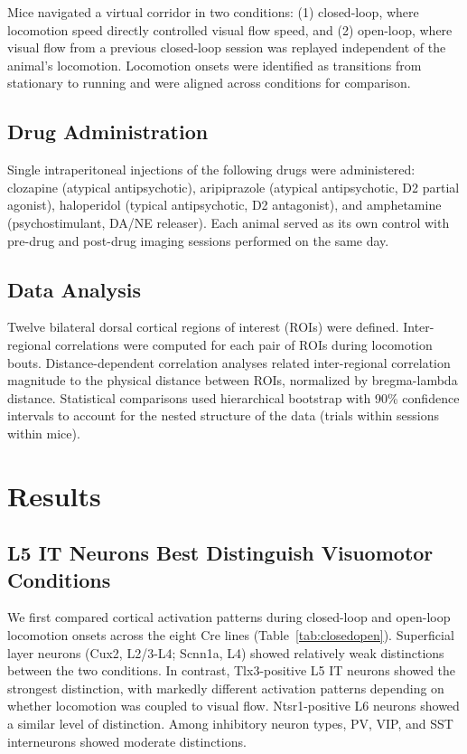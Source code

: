 \documentclass[11pt]{article}
\begin{document}
Mice navigated a virtual corridor in two conditions: (1) closed-loop, where locomotion speed directly controlled visual flow speed, and (2) open-loop, where visual flow from a previous closed-loop session was replayed independent of the animal's locomotion. Locomotion onsets were identified as transitions from stationary to running and were aligned across conditions for comparison.

\subsection{Drug Administration}

Single intraperitoneal injections of the following drugs were administered: clozapine (atypical antipsychotic), aripiprazole (atypical antipsychotic, D2 partial agonist), haloperidol (typical antipsychotic, D2 antagonist), and amphetamine (psychostimulant, DA/NE releaser). Each animal served as its own control with pre-drug and post-drug imaging sessions performed on the same day.

\subsection{Data Analysis}

Twelve bilateral dorsal cortical regions of interest (ROIs) were defined. Inter-regional correlations were computed for each pair of ROIs during locomotion bouts. Distance-dependent correlation analyses related inter-regional correlation magnitude to the physical distance between ROIs, normalized by bregma-lambda distance. Statistical comparisons used hierarchical bootstrap with 90\% confidence intervals to account for the nested structure of the data (trials within sessions within mice).

\section{Results}

\subsection{L5 IT Neurons Best Distinguish Visuomotor Conditions}

We first compared cortical activation patterns during closed-loop and open-loop locomotion onsets across the eight Cre lines (Table~\ref{tab:closedopen}). Superficial layer neurons (Cux2, L2/3-L4; Scnn1a, L4) showed relatively weak distinctions between the two conditions. In contrast, Tlx3-positive L5 IT neurons showed the strongest distinction, with markedly different activation patterns depending on whether locomotion was coupled to visual flow. Ntsr1-positive L6 neurons showed a similar level of distinction. Among inhibitory neuron types, PV, VIP, and SST interneurons showed moderate distinctions.
\end{document}
